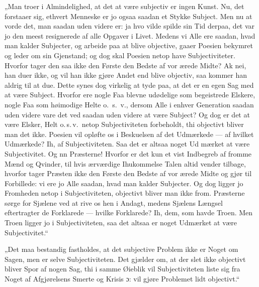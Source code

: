 „Man troer i Almindelighed, at det at være subjectiv er ingen
Kunst. Nu, det forstaaer sig, ethvert Menneske er jo ogsaa saadan
et Stykke Subject. Men nu at vorde det, man saadan uden videre er:
ja hvo vilde spilde sin Tid derpaa, det var jo den meest
resignerede af alle Opgaver i Livet. Medens vi Alle ere saadan,
hvad man kalder Subjecter, og arbeide paa at blive objective,
gaaer Poesien bekymret og leder om sin Gjenstand; og dog skal
Poesien netop have Subjectiviteter. Hvorfor tager den saa ikke den
Første den Bedste af vor ærede Midte? Ak nei, han duer ikke, og
vil han ikke gjøre Andet end blive objectiv, saa kommer han aldrig
til at due. Dette synes dog virkelig at tyde paa, at det er en
egen Sag med at være Subject. Hvorfor ere nogle Faa blevne
udødelige som begeistrede Elskere, nogle Faa som høimodige Helte
o.\ s.\ v., dersom Alle i enhver Generation saadan uden videre
vare det ved saadan uden videre at være Subject? Og dog er det at
være Elsker, Helt o.\,s.\,v.\ netop Subjectiviteten forbeholdt,
thi objectivt bliver man det ikke. Poesien vil opløfte os i
Beskuelsen af det Udmærkede --- af hvilket Udmærkede? Ih, af
Subjectiviteten. Saa det er altsaa noget Ud%
mærket at være Subjectivitet. Og nn Præsterne! Hvorfor er det kun
et vist Indbegreb af fromme Mænd og Qvinder, til hvis ærværdige
Ihukommelse Talen altid vender tilbage, hvorfor tager Præsten ikke
den Første den Bedste af vor ærede Midte og gjør til Forbillede:
vi ere jo Alle saadan, hvad man kalder Subjecter. Og dog ligger jo
Fromheden netop i Subjectiviteten, objectivt bliver man ikke from.
Præsterne sørge for Sjælene ved at rive os hen i Andagt, medens
Sjælens Længsel eftertragter de Forklarede --- hvilke Forklarede?
Ih, dem, som havde Troen. Men Troen ligger jo i Subjectiviteten,
saa det altsaa er noget Udmærket at være Subjectivitet.“

„Det maa bestandig fastholdes, at det subjective Problem ikke er
Noget om Sagen, men er selve Subjectiviteten. Det gjælder om, at
der slet ikke objectivt bliver Spor af nogen Sag, thi i samme
Øieblik vil Subjectiviteten liste sig fra Noget af Afgjørelsens
Smerte og Krisis ɔ: vil gjøre Problemet lidt objectivt.“


